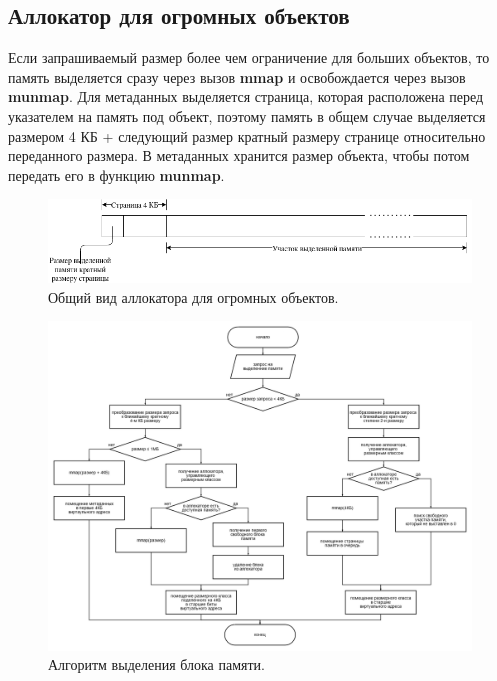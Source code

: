\subsection{Аллокатор для огромных объектов}
Если запрашиваемый размер более чем ограничение для больших объектов, то память выделяется сразу через вызов \textbf{mmap} и освобождается через вызов \textbf{munmap}. Для метаданных выделяется страница, которая расположена перед указателем на память под объект, поэтому память в общем случае выделяется размером 4 КБ + следующий размер кратный размеру странице относительно переданного размера. В метаданных хранится размер объекта, чтобы потом передать его в функцию \textbf{munmap}.

\begin{figure}[!h]
	\begin{center}
		\includegraphics[scale=0.5]{images/huge-allocator-design.png}
		\caption{Общий вид аллокатора для огромных объектов.}
		\label{huge-allocator-design}
	\end{center}
\end{figure}


\begin{figure}[!h]
	\begin{center}
		\includegraphics[scale=0.4, angle=90]{images/allocation.png}
		\caption{Алгоритм выделения блока памяти.}
		\label{structure}
	\end{center}
\end{figure}

